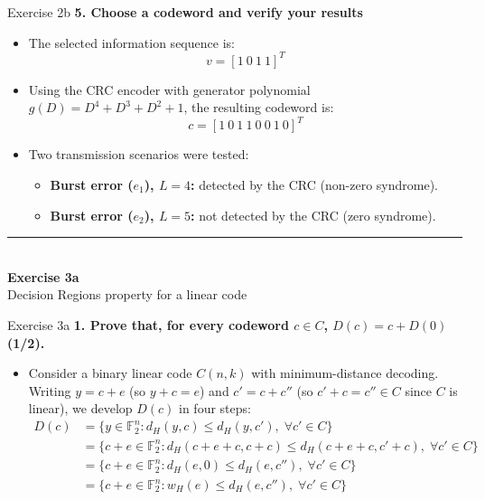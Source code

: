 \documentclass[10pt, aspectratio=169]{beamer}
\newcommand{\question}[1]{{\color{QuestionRed}\textbf{#1}}}
\begin{document}
\begin{frame}{Exercise 2b}
  \question{5. Choose a codeword and verify your results}

  \vspace{0.25cm}
  \begin{itemize}
    \item The selected information sequence is:
    \[
      v = [1\ 0\ 1\ 1]^T
    \]
    \item Using the CRC encoder with generator polynomial $g(D) = D^4 + D^3 + D^2 + 1$, the resulting codeword is:
    \[
      c = [1\ 0\ 1\ 1\ 0\ 0\ 1\ 0]^T
    \]
    \item Two transmission scenarios were tested:
    \begin{itemize}
      \item \textbf{Burst error ($e_1$), $L = 4$:} detected by the CRC (non-zero syndrome).
      \item \textbf{Burst error ($e_2$), $L = 5$:} not detected by the CRC (zero syndrome).
    \end{itemize}
  \end{itemize}
\end{frame}

\begin{frame}[plain]
  \vfill
  \centering
  {\color{TealAccent}\rule{2cm}{2pt}}\\[0.4cm]
  {\LARGE\bfseries\color{NavyPrimary} Exercise 3a}\\[0.2cm]
  {\large\color{SlateNeutral} Decision Regions property for a linear code}
  \vfill
\end{frame}

\begin{frame}{Exercise 3a}
  \question{1. Prove that, for every codeword $c \in C$, $D(c) = c + D(0)$ (1/2).}

  \vspace{0.1cm}
  \begin{itemize}
    \item Consider a binary linear code $C(n,k)$ with minimum-distance decoding. Writing $y = c + e$ (so $y + c = e$) and $c' = c + c''$ (so $c' + c = c'' \in C$ since $C$ is linear), we develop $D(c)$ in four steps:
    \[
      \begin{aligned}
        D(c) &= \{ y \in \mathbb{F}_2^n : d_H(y, c) \le d_H(y, c'), \; \forall c' \in C \} \\
             &= \{ c + e \in \mathbb{F}_2^n : d_H(c + e + c, c + c) \le d_H(c + e + c, c' + c), \; \forall c' \in C \} \\
             &= \{ c + e \in \mathbb{F}_2^n : d_H(e, 0) \le d_H(e, c''), \; \forall c' \in C \} \\
             &= \{ c + e \in \mathbb{F}_2^n : w_H(e) \le d_H(e, c''), \; \forall c' \in C \}
      \end{aligned}
    \]
  \end{itemize}
\end{frame}
\end{document}
